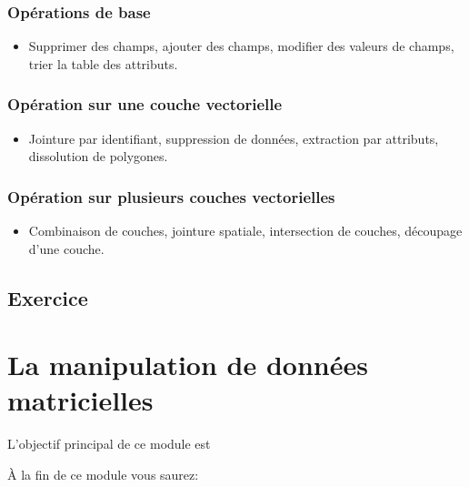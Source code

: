 \documentclass[
  12pt,
]{krantz}
\providecommand{\tightlist}{%
  \setlength{\itemsep}{0pt}\setlength{\parskip}{0pt}}
\begin{document}
\hypertarget{opuxe9rations-de-base}{%
\subsection{Opérations de base}\label{opuxe9rations-de-base}}

\begin{itemize}
\tightlist
\item
  Supprimer des champs, ajouter des champs, modifier des valeurs de champs, trier la table des attributs.
\end{itemize}

\hypertarget{opuxe9ration-sur-une-couche-vectorielle}{%
\subsection{Opération sur une couche vectorielle}\label{opuxe9ration-sur-une-couche-vectorielle}}

\begin{itemize}
\tightlist
\item
  Jointure par identifiant, suppression de données, extraction par attributs, dissolution de polygones.
\end{itemize}

\hypertarget{opuxe9ration-sur-plusieurs-couches-vectorielles}{%
\subsection{Opération sur plusieurs couches vectorielles}\label{opuxe9ration-sur-plusieurs-couches-vectorielles}}

\begin{itemize}
\tightlist
\item
  Combinaison de couches, jointure spatiale, intersection de couches, découpage d'une couche.
\end{itemize}

\hypertarget{exercice-5}{%
\section{Exercice}\label{exercice-5}}

\hypertarget{map_mat}{%
\chapter{La manipulation de données matricielles}\label{map_mat}}

L'objectif principal de ce module est

À la fin de ce module vous saurez:
\end{document}
